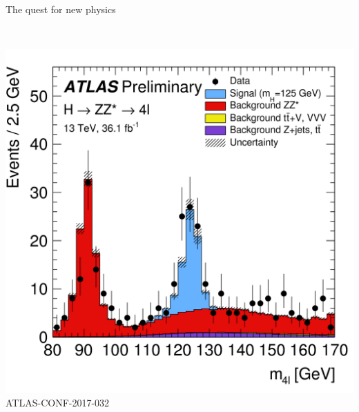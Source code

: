\documentclass[9pt,usenames,dvipsnames]{beamer}
\begin{document}
\begin{frame}{The quest for new physics}
\begin{columns}[c]
\begin{center}
			{\tiny {}}\\
			\includegraphics[width= .55\textwidth]{./assets/higgs-1} \\
			{\tiny ATLAS-CONF-2017-032}
		\end{center}
	\end{columns}
\end{frame}

\end{document}
